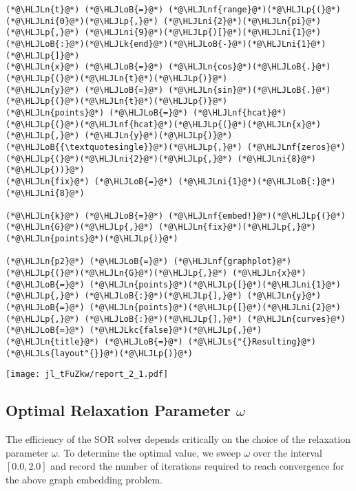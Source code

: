 \documentclass[12pt,a4paper]{article}
\newcommand{\HLJLk}[1]{\textcolor[RGB]{148,91,176}{\textbf{#1}}}
\newcommand{\HLJLkc}[1]{\textcolor[RGB]{59,151,46}{\textit{#1}}}
\newcommand{\HLJLn}[1]{#1}
\newcommand{\HLJLnf}[1]{\textcolor[RGB]{66,102,213}{#1}}
\newcommand{\HLJLs}[1]{\textcolor[RGB]{201,61,57}{#1}}
\newcommand{\HLJLni}[1]{\textcolor[RGB]{59,151,46}{#1}}
\newcommand{\HLJLoB}[1]{\textcolor[RGB]{102,102,102}{\textbf{#1}}}
\newcommand{\HLJLp}[1]{#1}
\begin{document}
\begin{lstlisting}
(*@\HLJLn{t}@*) (*@\HLJLoB{=}@*) (*@\HLJLnf{range}@*)(*@\HLJLp{(}@*)(*@\HLJLni{0}@*)(*@\HLJLp{,}@*) (*@\HLJLni{2}@*)(*@\HLJLn{pi}@*)(*@\HLJLp{,}@*) (*@\HLJLni{9}@*)(*@\HLJLp{)[}@*)(*@\HLJLni{1}@*)(*@\HLJLoB{:}@*)(*@\HLJLk{end}@*)(*@\HLJLoB{-}@*)(*@\HLJLni{1}@*)(*@\HLJLp{]}@*)
(*@\HLJLn{x}@*) (*@\HLJLoB{=}@*) (*@\HLJLn{cos}@*)(*@\HLJLoB{.}@*)(*@\HLJLp{(}@*)(*@\HLJLn{t}@*)(*@\HLJLp{)}@*)
(*@\HLJLn{y}@*) (*@\HLJLoB{=}@*) (*@\HLJLn{sin}@*)(*@\HLJLoB{.}@*)(*@\HLJLp{(}@*)(*@\HLJLn{t}@*)(*@\HLJLp{)}@*)
(*@\HLJLn{points}@*) (*@\HLJLoB{=}@*) (*@\HLJLnf{hcat}@*)(*@\HLJLp{(}@*)(*@\HLJLnf{hcat}@*)(*@\HLJLp{(}@*)(*@\HLJLn{x}@*)(*@\HLJLp{,}@*) (*@\HLJLn{y}@*)(*@\HLJLp{)}@*)(*@\HLJLoB{{\textquotesingle}}@*)(*@\HLJLp{,}@*) (*@\HLJLnf{zeros}@*)(*@\HLJLp{(}@*)(*@\HLJLni{2}@*)(*@\HLJLp{,}@*) (*@\HLJLni{8}@*)(*@\HLJLp{))}@*)
(*@\HLJLn{fix}@*) (*@\HLJLoB{=}@*) (*@\HLJLni{1}@*)(*@\HLJLoB{:}@*)(*@\HLJLni{8}@*)

(*@\HLJLn{k}@*) (*@\HLJLoB{=}@*) (*@\HLJLnf{embed!}@*)(*@\HLJLp{(}@*)(*@\HLJLn{G}@*)(*@\HLJLp{,}@*) (*@\HLJLn{fix}@*)(*@\HLJLp{,}@*) (*@\HLJLn{points}@*)(*@\HLJLp{)}@*)

(*@\HLJLn{p2}@*) (*@\HLJLoB{=}@*) (*@\HLJLnf{graphplot}@*)(*@\HLJLp{(}@*)(*@\HLJLn{G}@*)(*@\HLJLp{,}@*) (*@\HLJLn{x}@*) (*@\HLJLoB{=}@*) (*@\HLJLn{points}@*)(*@\HLJLp{[}@*)(*@\HLJLni{1}@*)(*@\HLJLp{,}@*) (*@\HLJLoB{:}@*)(*@\HLJLp{],}@*) (*@\HLJLn{y}@*) (*@\HLJLoB{=}@*) (*@\HLJLn{points}@*)(*@\HLJLp{[}@*)(*@\HLJLni{2}@*)(*@\HLJLp{,}@*) (*@\HLJLoB{:}@*)(*@\HLJLp{],}@*) (*@\HLJLn{curves}@*) (*@\HLJLoB{=}@*) (*@\HLJLkc{false}@*)(*@\HLJLp{,}@*) (*@\HLJLn{title}@*) (*@\HLJLoB{=}@*) (*@\HLJLs{"{}Resulting}@*) (*@\HLJLs{layout"{}}@*)(*@\HLJLp{)}@*)
\end{lstlisting}

\texttt{[image: jl\_tFuZkw/report\_2\_1.pdf]}

\subsection{Optimal Relaxation Parameter $\omega$}
The efficiency of the SOR solver depends critically on the choice of the relaxation parameter $\omega$.   To determine the optimal value, we sweep $\omega$ over the interval $[0.0, 2.0]$ and record the number of iterations required to reach convergence for the above graph embedding problem.
\end{document}
